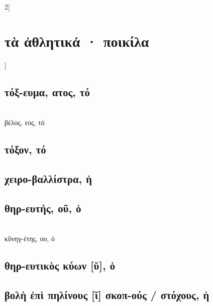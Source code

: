 \documentclass{book}
\begin{document}
\begin{multicols}{2}[\section{τὰ ἀθλητικά · ποικίλα}]
\subsection{τόξ-ευμα, ατος, τό}
 ~\\
βέλος, εος, τό
\subsection{τόξον, τό}
\subsection{χειρο-βαλλίστρα, ἡ}
\subsection{θηρ-ευτής, οῦ, ὁ}
 ~\\
κῠνηγ-έτης, ου, ὁ 
\subsection{θηρ-ευτικὸς κύων [ῠ], ὁ}
\subsection{βολὴ ἐπὶ πηλίνους [ῐ] σκοπ-ούς  / στόχους, ἡ}      
~
\end{multicols}
\newpage  
\end{document}

